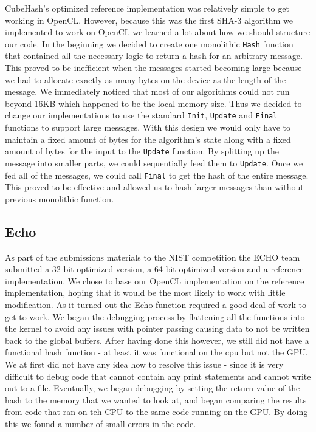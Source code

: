 CubeHash's optimized reference implementation was relatively simple to get working in OpenCL.
However, because this was the first SHA-3 algorithm we implemented to work on OpenCL we learned a lot about how we should structure our code.
In the beginning we decided to create one monolithic {\tt Hash} function that contained all the necessary logic to return a hash for an arbitrary message.
This proved to be inefficient when the messages started becoming large because we had to allocate exactly as many bytes on the device as the length of the message.
We immediately noticed that most of our algorithms could not run beyond 16KB which happened to be the local memory size.
Thus we decided to change our implementations to use the standard {\tt Init}, {\tt Update} and {\tt Final} functions to support large messages.
With this design we would only have to maintain a fixed amount of bytes for the algorithm's state along with a fixed amount of bytes for the input to the {\tt Update} function.
By splitting up the message into smaller parts, we could sequentially feed them to {\tt Update}.
Once we fed all of the messages, we could call {\tt Final} to get the hash of the entire message.
This proved to be effective and allowed us to hash larger messages than without previous monolithic function.

\subsection*{Echo}

As part of the submissions materials to the NIST competition the ECHO team submitted a 32 bit optimized version, a 64-bit optimized version and a reference implementation.  
We chose to base our OpenCL implementation on the reference implementation, hoping that it would be the most likely to work with little modification.
As it turned out the Echo function required a good deal of work to get to work.
We began the debugging process by flattening all the functions into the kernel to avoid any issues with pointer passing causing data to not be written back to the global buffers.
After having done this however, we still did not have a functional hash function - at least it was functional on the cpu but not the GPU.  
We at first did not have any idea how to resolve this issue - since it is very difficult to debug code that cannot contain any print statements and cannot write out to a file. 
Eventually, we began debugging by setting the return value of the hash to the memory that we wanted to look at, and began comparing the results from code that ran on teh CPU to the same code running on the GPU.
By doing this we found a number of small errors in the code.

